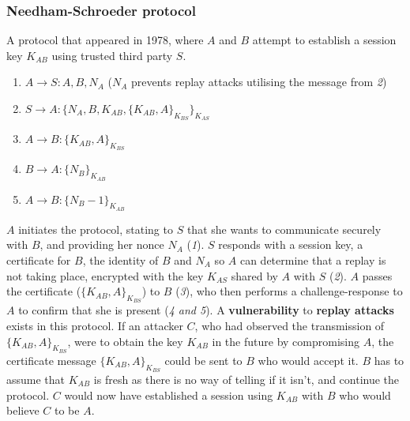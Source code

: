 \documentclass[final]{article}
\begin{document}
\subsubsection{Needham-Schroeder protocol}
A protocol that appeared in 1978, where $ A $ and $ B $ attempt to establish a session key $ K_{AB} $ using trusted third party $ S $.
\begin{enumerate}
	\item $ A \rightarrow S : A, B, N_{A} $ \hspace{6pt} ($ N_{A} $ prevents replay attacks utilising the message from \textit{2})
	\item $ S \rightarrow A : \{ N_{A}, B, K_{AB}, \{ K_{AB}, A \}_{K_{BS}} \}_{K_{AS}} $
	\item $ A \rightarrow B : \{ K_{AB}, A \}_{K_{BS}} $
	\item $ B \rightarrow A : \{ N_{B} \}_{K_{AB}}  $
	\item $ A \rightarrow B : \{ N_{B} - 1 \}_{K_{AB}} $
\end{enumerate}
$ A $ initiates the protocol, stating to $ S $ that she wants to communicate securely with $ B $, and providing her nonce $ N_{A} $ (\textit{1}). $ S $ responds with a session key, a certificate for $ B $, the identity of $ B $ and $ N_{A} $ so $ A $ can determine that a replay is not taking place, encrypted with the key $ K_{AS} $ shared by $ A $ with $ S $ (\textit{2}). $ A $ passes the certificate ($ \{ K_{AB}, A \}_{K_{BS}} $) to $ B $ (\textit{3}), who then performs a challenge-response to $ A $ to confirm that she is present (\textit{4 and 5}). A \textbf{vulnerability} to \textbf{replay attacks} exists in this protocol. If an attacker $ C $, who had observed the transmission of $ \{ K_{AB}, A \}_{K_{BS}} $, were to obtain the key $ K_{AB} $ in the future by compromising $ A $, the certificate message $ \{ K_{AB}, A \}_{K_{BS}} $ could be sent to $ B $ who would accept it. $ B $ has to assume that $ K_{AB} $ is fresh as there is no way of telling if it isn't, and continue the protocol. $ C $ would now have established a session using $ K_{AB} $ with $ B $ who would believe $ C $ to be $ A $.
\end{document}
